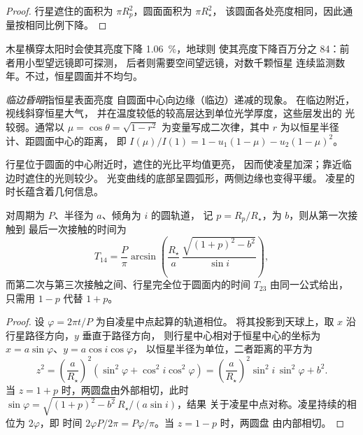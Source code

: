 \begin{proof}
行星遮住的面积为 $\pi R_p^2$，圆面面积为 $\pi R_\star^2$，
该圆面各处亮度相同，因此通量按相同比例下降。
\end{proof}

木星横穿太阳时会使其亮度下降 \qty{1.06}{\percent}，地球则
使其亮度下降百万分之 \num{84}：前者用小型望远镜即可探测，
后者则需要空间望远镜，对数千颗恒星
连续监测数年。不过，恒星圆面并不均匀。

\begin{definition}[临边昏暗]\label{def:b3:exoplanets:limb}
\emph{临边昏暗}指恒星表面亮度
自圆面中心向边缘（临边）递减的现象。
在临边附近，视线斜穿恒星大气，
并在温度较低的较高层达到单位光学厚度，这些层发出的
光较弱。通常以 $\mu = \cos\theta =
\sqrt{1 - r^2}$ 为变量写成二次律，其中 $r$ 为以恒星半径计、距圆面中心的距离，
即 $I(\mu)/I(1) = 1 - u_1(1 - \mu) - u_2(1 - \mu)^2$。
\end{definition}

行星位于圆面的中心附近时，遮住的光比平均值更亮，
因而使凌星加深；靠近临边时遮住的光则较少。
光变曲线的底部呈圆弧形，两侧边缘也变得平缓。
凌星的时长蕴含着几何信息。

\begin{theorem}[凌星时长]\label{thm:b3:exoplanets:duration}
对周期为 $P$、半径为 $a$、倾角为 $i$ 的圆轨道，
记 $p = R_p/R_\star$，为 $b$，则从第一次接触到
最后一次接触的时间为
\[
T_{14} = \frac{P}{\pi}\arcsin\!\left(\frac{R_\star}{a}\,
          \frac{\sqrt{(1 + p)^2 - b^2}}{\sin i}\right),
\]
而第二次与第三次接触之间、行星完全位于圆面内的时间
$T_{23}$ 由同一公式给出，
只需用 $1 - p$ 代替 $1 + p$。
\end{theorem}

\begin{proof}
设 $\varphi = 2\pi t/P$ 为自凌星中点起算的轨道相位。
将其投影到天球上，取 $x$ 沿行星路径方向，$y$ 垂直于路径方向，
则行星中心相对于恒星中心的坐标为 $x = a\sin\varphi$、$y = a\cos i\cos\varphi$，
以恒星半径为单位，二者距离的平方为
\[
z^2 = \left(\frac{a}{R_\star}\right)^2(\sin^2\varphi + \cos^2 i\cos^2\varphi)
    = \left(\frac{a}{R_\star}\right)^2\sin^2 i\,\sin^2\varphi + b^2 .
\]
当 $z = 1 + p$ 时，两圆盘由外部相切，此时
$\sin\varphi = \sqrt{(1 + p)^2 - b^2}\,R_\star/(a\sin i)$，结果
关于凌星中点对称。凌星持续的相位为 $2\varphi$，即
时间 $2\varphi P/2\pi = P\varphi/\pi$。当 $z = 1 - p$ 时，两圆盘
由内部相切。
\end{proof}

